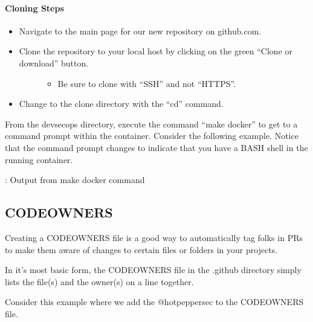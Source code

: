 \paragraph{Cloning Steps}

\begin{itemize}
      \item
            Navigate to the main page for our new repository on github.com.
      \item
            \begin{description}
                  \item[Clone the repository to your local host by clicking on the green
                        ``Clone or download'' button.]
                        \begin{itemize}

                              \item
                                    Be sure to clone with ``SSH'' and not ``HTTPS''.
                        \end{itemize}
            \end{description}
      \item
            Change to the clone directory with the ``cd'' command.
\end{itemize}

\justify{}
From the devsecops directory, execute the command
``make docker'' to get to a command prompt within the container.
\justify{}
Consider the following example. Notice that the command prompt changes
to indicate that you have a BASH shell in the running container.

\begin{mybox}{\thetcbcounter: Output from make docker command}
  
\end{mybox}

\subsection{CODEOWNERS}

\justify{}
Creating a CODEOWNERS file
is a good way to automatically tag folks in PRs to make them aware of
changes to certain files or folders in your projects.

\justify{}
In it's most basic form, the CODEOWNERS file in the .github directory
simply lists the file(s) and the owner(s) on a line together.

\justify{}
Consider this example where we add the @hotpeppersec to the CODEOWNERS
file.

